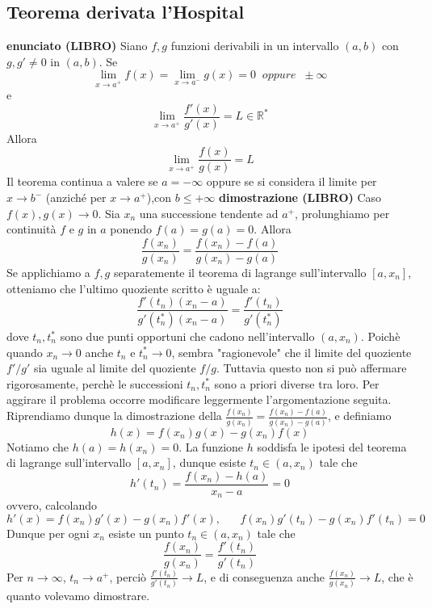 \documentclass[a4paper, 9pt]{report}
\begin{document}
\subsection*{Teorema derivata l'Hospital}
\textbf{enunciato (LIBRO)}\newline
Siano $f, g$ funzioni derivabili in un intervallo $(a,b)$ con $g, g' \neq 0$ in $(a,b)$. Se
\[
    \lim_{x\rightarrow a^+} f(x) = \lim_{x\rightarrow a^-} g(x) = 0 \;\; oppure \;\; \pm \infty
\]
e
\[
    \lim_{x\rightarrow a^+} \frac{f'(x)}{g'(x)} = L \in \mathbb{R}^*
\]
Allora
\[
    \lim_{x\rightarrow a^+} \frac{f(x)}{g(x)} =L
\]
Il teorema continua a valere se $a = -\infty$ oppure se si considera il limite per $x \rightarrow b^-$ (anziché per $x \rightarrow a^+$),con $b\leq+\infty$\newline
\newline
\textbf{dimostrazione (LIBRO)}\newline
Caso $f(x), g(x) \rightarrow 0$. Sia $x_n$ una successione tendente ad $a^+$, prolunghiamo per continuità $f$ e $g$ in $a$ ponendo $f(a) = g(a) = 0$. Allora
\[
    \frac{f(x_n)}{g(x_n)} = \frac{f(x_n) -f(a)}{g(x_n)-g(a)}
\]
Se applichiamo a $f,g$ separatemente il teorema di lagrange sull'intervallo $[a, x_n]$, otteniamo che l'ultimo quoziente scritto è uguale a:
\[
    \frac{f'(t_n)(x_n -a)}{g'(t_n^*)(x_n-a)} = \frac{f'(t_n)}{g'(t_n^*)}
\]
dove $t_n, t_n^*$ sono due punti opportuni che cadono nell'intervallo $(a,x_n)$. Poichè quando $x_n \rightarrow 0$ anche $t_n$ e $t_n^*\rightarrow 0$, sembra "ragionevole" che il limite del quoziente $f'/g'$ sia uguale al limite del quoziente $f/g$. Tuttavia questo non si può affermare rigorosamente, perchè le successioni $t_n, t_n^*$ sono a priori diverse tra loro. Per aggirare il problema occorre modificare leggermente l'argomentazione seguita. Riprendiamo dunque la dimostrazione della $\frac{f(x_n)}{g(x_n)} = \frac{f(x_n) -f(a)}{g(x_n)-g(a)}$, e definiamo
\[
    h(x) = f(x_n) g(x) - g(x_n) f(x)
\]
Notiamo che $h(a) = h(x_n) = 0$. La funzione $h$ soddisfa le ipotesi del teorema di lagrange sull'intervallo $[a,x_n]$, dunque esiste $t_n \in(a,x_n)$ tale che 
\[
    h'(t_n) = \frac{f(x_n) - h(a)}{x_n-a} = 0
\]
ovvero, calcolando
\[
    h'(x) = f(x_n)g'(x) -g(x_n) f'(x), \;\;\;\;\;\; f(x_n)g'(t_n)-g(x_n)f'(t_n) = 0
\]
Dunque per ogni $x_n$ esiste un punto $t_n \in (a,x_n)$ tale che 
\[
    \frac{f(x_n)}{g(x_n)} = \frac{f'(t_n)}{g'(t_n)}
\]
Per $n \rightarrow  \infty$, $t_n \rightarrow a^+$, perciò $\frac{f'(t_n)}{g'(t_n)} \rightarrow L$, e di conseguenza anche $\frac{f(x_n)}{g(x_n)} \rightarrow L$, che è quanto volevamo dimostrare.
\end{document}
